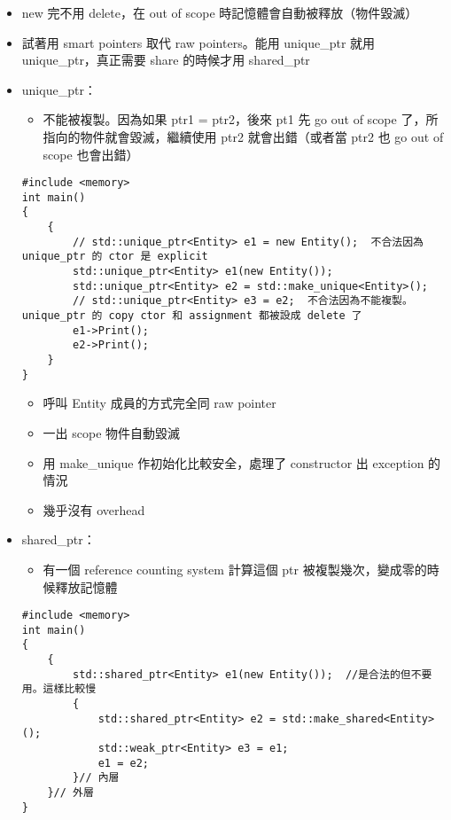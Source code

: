 \documentclass[11pt]{article}
\providecommand{\tightlist}{%
      \setlength{\itemsep}{0pt}\setlength{\parskip}{0pt}}
\begin{document}
\begin{itemize}
\tightlist
\item
  new 完不用 delete，在 out of scope 時記憶體會自動被釋放（物件毀滅）
\item
  試著用 smart pointers 取代 raw pointers。能用 unique\_ptr 就用
  unique\_ptr，真正需要 share 的時候才用 shared\_ptr
\item
  unique\_ptr：

  \begin{itemize}
  \tightlist
  \item
    不能被複製。因為如果 ptr1 = ptr2，後來 pt1 先 go out of scope
    了，所指向的物件就會毀滅，繼續使用 ptr2 就會出錯（或者當 ptr2 也 go
    out of scope 也會出錯）
  \end{itemize}

\begin{verbatim}
#include <memory>
int main()
{
    {
        // std::unique_ptr<Entity> e1 = new Entity();  不合法因為 unique_ptr 的 ctor 是 explicit
        std::unique_ptr<Entity> e1(new Entity());
        std::unique_ptr<Entity> e2 = std::make_unique<Entity>();
        // std::unique_ptr<Entity> e3 = e2;  不合法因為不能複製。unique_ptr 的 copy ctor 和 assignment 都被設成 delete 了
        e1->Print();
        e2->Print();
    }
}
\end{verbatim}

  \begin{itemize}
  \tightlist
  \item
    呼叫 Entity 成員的方式完全同 raw pointer
  \item
    一出 scope 物件自動毀滅
  \item
    用 make\_unique 作初始化比較安全，處理了 constructor 出 exception
    的情況
  \item
    幾乎沒有 overhead
  \end{itemize}
\item
  shared\_ptr：

  \begin{itemize}
  \tightlist
  \item
    有一個 reference counting system 計算這個 ptr
    被複製幾次，變成零的時候釋放記憶體
  \end{itemize}

\begin{verbatim}
#include <memory>
int main()
{
    {
        std::shared_ptr<Entity> e1(new Entity());  //是合法的但不要用。這樣比較慢
        {
            std::shared_ptr<Entity> e2 = std::make_shared<Entity>();
            std::weak_ptr<Entity> e3 = e1;
            e1 = e2;
        }// 內層
    }// 外層
}
\end{verbatim}


\end{itemize}
\end{document}
